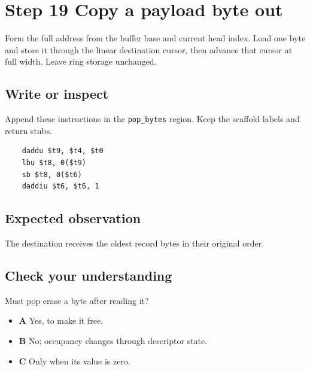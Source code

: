 \section{Step 19 Copy a payload byte out}\label{ring-s19}

Form the full address from the buffer base and current head index. Load one byte and store it through the linear destination cursor, then advance that cursor at full width. Leave ring storage unchanged.

\subsection{Write or inspect}
Append these instructions in the \texttt{pop\_bytes} region. Keep the scaffold labels and return stubs.

\begin{verbatim}
    daddu $t9, $t4, $t0
    lbu $t8, 0($t9)
    sb $t8, 0($t6)
    daddiu $t6, $t6, 1
\end{verbatim}

\subsection{Expected observation}
The destination receives the oldest record bytes in their original order.

\subsection{Check your understanding}
Must pop erase a byte after reading it?

\begin{itemize}
  \item \textbf{A} Yes, to make it free.
  \item \textbf{B} No; occupancy changes through descriptor state.
  \item \textbf{C} Only when its value is zero.
\end{itemize}
